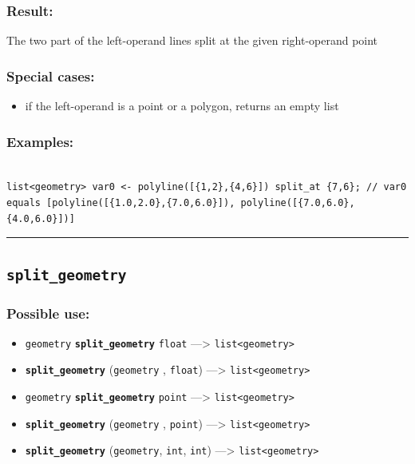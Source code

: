 \documentclass[]{book}
\providecommand{\tightlist}{%
  \setlength{\itemsep}{0pt}\setlength{\parskip}{0pt}}
\theoremstyle{definition}
\theoremstyle{definition}
\theoremstyle{definition}
\theoremstyle{remark}
\begin{document}
\subsubsection{Result:}\label{result-476}

The two part of the left-operand lines split at the given right-operand
point

\subsubsection{Special cases:}\label{special-cases-128}

\begin{itemize}
\tightlist
\item
  if the left-operand is a point or a polygon, returns an empty list
\end{itemize}

\subsubsection{Examples:}\label{examples-343}

\begin{verbatim}
 
list<geometry> var0 <- polyline([{1,2},{4,6}]) split_at {7,6}; // var0 equals [polyline([{1.0,2.0},{7.0,6.0}]), polyline([{7.0,6.0},{4.0,6.0}])]
\end{verbatim}

\begin{center}\rule{0.5\linewidth}{\linethickness}\end{center}

\subsection{\texorpdfstring{\texttt{split\_geometry}}{split\_geometry}}\label{split_geometry}

\subsubsection{Possible use:}\label{possible-use-493}

\begin{itemize}
\tightlist
\item
  \texttt{geometry} \textbf{\texttt{split\_geometry}} \texttt{float}
  ---\textgreater{} \texttt{list\textless{}geometry\textgreater{}}
\item
  \textbf{\texttt{split\_geometry}} (\texttt{geometry} , \texttt{float})
  ---\textgreater{} \texttt{list\textless{}geometry\textgreater{}}
\item
  \texttt{geometry} \textbf{\texttt{split\_geometry}} \texttt{point}
  ---\textgreater{} \texttt{list\textless{}geometry\textgreater{}}
\item
  \textbf{\texttt{split\_geometry}} (\texttt{geometry} , \texttt{point})
  ---\textgreater{} \texttt{list\textless{}geometry\textgreater{}}
\item
  \textbf{\texttt{split\_geometry}} (\texttt{geometry}, \texttt{int},
  \texttt{int}) ---\textgreater{}
  \texttt{list\textless{}geometry\textgreater{}}
\end{itemize}
\end{document}
